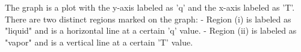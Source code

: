 The graph is a plot with the y-axis labeled as 'q' and the x-axis labeled as 'T'. There are two distinct regions marked on the graph:
- Region (i) is labeled as "liquid" and is a horizontal line at a certain 'q' value.
- Region (ii) is labeled as "vapor" and is a vertical line at a certain 'T' value.